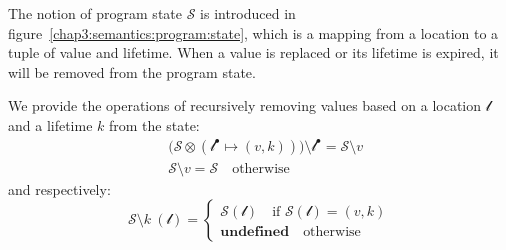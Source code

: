 The notion of program state $\mathcal{S}$ is introduced in figure~\ref{chap3:semantics:program:state}, which is a mapping from a location to a tuple of value and lifetime. When a value is replaced or its lifetime is expired, it will be removed from the program state.

We provide the operations of recursively removing values based on a location $\mathscr{l}$ and a lifetime $k$ from the state: 
\begin{align*}
      &\bigl(\mathcal{S}\otimes(\mathscr{l}^\bullet \mapsto (v, k))\bigr)\setminus {\mathscr{l}^\bullet} = \mathcal{S}\setminus v \\
      &\mathcal{S}\setminus v = \mathcal{S} \quad\text{otherwise}
\end{align*}
and respectively:
\[
   \mathcal{S}\setminus k \ (\mathscr{l}) =
    \begin{cases}
      \mathcal{S}(\mathscr{l}) \quad\text{if $\mathcal{S}(\mathscr{l})=(v,k)$} \\
      \textbf{undefined}\quad\text{otherwise}
    \end{cases}
\]

